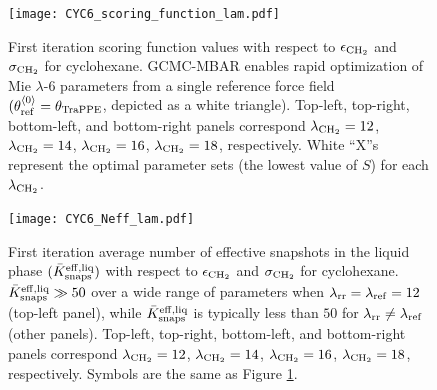 \documentclass[journal=jced,manuscript=article]{achemso}
\begin{document}
	\begin{figure}[htb!]
		\centering
		\texttt{[image: CYC6\_scoring\_function\_lam.pdf]}
		\caption{First iteration scoring function values with respect to $\epsilon_{\rm CH_2}$ and $\sigma_{\rm CH_2}$ for cyclohexane. GCMC-MBAR enables rapid optimization of Mie $\lambda$-6 parameters from a single reference force field $(\theta^{\langle0\rangle}_{\rm ref} = \theta_{\rm TraPPE}$, depicted as a white triangle). Top-left, top-right, bottom-left, and bottom-right panels correspond $\lambda_{\rm CH_2} = 12$, $\lambda_{\rm CH_2} = 14$, $\lambda_{\rm CH_2} = 16$, $\lambda_{\rm CH_2} = 18$, respectively. White ``X''s represent the optimal parameter sets (the lowest value of $S$) for each $\lambda_{\rm CH_2}$.} %
		\label{fig:Score_CYC6}
	\end{figure} 

	\begin{figure}[htb!]
		\centering
		\texttt{[image: CYC6\_Neff\_lam.pdf]}
		\caption{First iteration average number of effective snapshots in the liquid phase $(\bar K_{\rm snaps}^{\rm eff, liq})$ with respect to $\epsilon_{\rm CH_2}$ and $\sigma_{\rm CH_2}$ for cyclohexane. $\bar K_{\rm snaps}^{\rm eff, liq} \gg 50$ over a wide range of parameters when $\lambda_{\rm rr} = \lambda_{\rm ref} = 12$ (top-left panel), while $\bar K_{\rm snaps}^{\rm eff, liq}$ is typically less than $50$ for $\lambda_{\rm rr} \neq \lambda_{\rm ref}$ (other panels). Top-left, top-right, bottom-left, and bottom-right panels correspond $\lambda_{\rm CH_2} = 12$, $\lambda_{\rm CH_2} = 14$, $\lambda_{\rm CH_2} = 16$, $\lambda_{\rm CH_2} = 18$, respectively. Symbols are the same as Figure \ref{fig:Score_CYC6}.}%
		\label{fig:Neff_CYC6}
	\end{figure}
\end{document}
